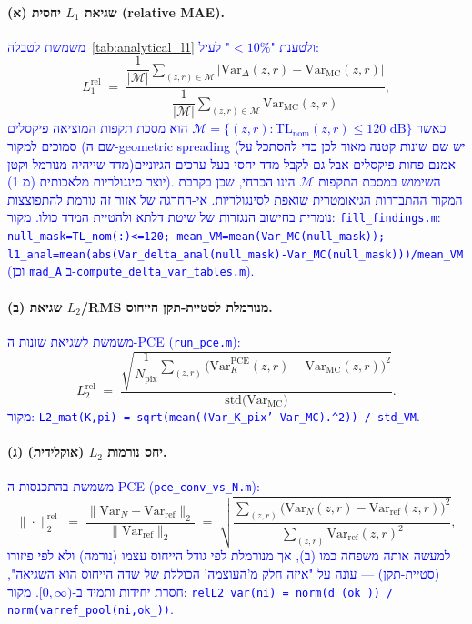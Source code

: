 \documentclass[12pt,a4paper]{article}
\newcommand{\Var}{\mathrm{Var}}
\DeclareRobustCommand{\aiedit}[1]{\textcolor{blue}{#1}}
\begin{document}
\paragraph{(א) שגיאת $L_1$ יחסית (\textenglish{relative MAE}).}
\aiedit{משמשת לטבלה~\ref{tab:analytical_l1} ולטענת "$<10\%{}$" לעיל:}
\begin{equation}
  L_1^{\mathrm{rel}} \;=\; \frac{\dfrac{1}{|\mathcal M|}\sum\limits_{(z,r)\in\mathcal M}
  \bigl|\Var_\Delta(z,r)-\Var_{\mathrm{MC}}(z,r)\bigr|}
  {\dfrac{1}{|\mathcal M|}\sum\limits_{(z,r)\in\mathcal M}\Var_{\mathrm{MC}}(z,r)},
  \label{eq:l1_rel}
\end{equation}
\aiedit{כאשר $\mathcal M=\{(z,r):\mathrm{TL}_{\mathrm{nom}}(z,r)\le120\text{ dB}\}$ הוא מסכת תקפות
המוציאה פיקסלים סמוכים למקור (שם ה-\textenglish{geometric spreading} (יש שם שונות קטנה מאוד לכן כדי להסתכל על אמנם פחות פיקסלים אבל גם לקבל  מדד יחסי בעל ערכים הגיוניים(מדד שייהיה מנורמל וקטן מ 1)) יוצר סינגולריות מלאכותית).
השימוש במסכת התקפות $\mathcal{M}$ הינו הכרחי, שכן בקרבת המקור ההתבדרות הגיאומטרית שואפת לסינגולריות.
אי-החרגה של אזור זה גורמת להתפוצצות נומרית בחישוב הנגזרות של שיטת דלתא ולהטיית המדד כולו.
מקור: \texttt{fill\_findings.m}: \texttt{null\_mask=TL\_nom(:)<=120; mean\_VM=mean(Var\_MC(null\_mask));
l1\_anal=mean(abs(Var\_delta\_anal(null\_mask)-Var\_MC(null\_mask)))/mean\_VM} (וכן \texttt{mad\_A}
ב-\texttt{compute\_delta\_var\_tables.m}).}

\paragraph{(ב) שגיאת $L_2$/\textenglish{RMS} מנורמלת לסטיית-תקן הייחוס.}
\aiedit{משמשת לשגיאת שונות ה-\textenglish{PCE} (\texttt{run\_pce.m}):}
\begin{equation}
  L_2^{\mathrm{rel}} \;=\; \frac{\sqrt{\dfrac{1}{N_{\mathrm{pix}}}\sum\limits_{(z,r)}
  \bigl(\Var_K^{\mathrm{PCE}}(z,r)-\Var_{\mathrm{MC}}(z,r)\bigr)^2}}{\mathrm{std}\bigl(\Var_{\mathrm{MC}}\bigr)}.
  \label{eq:l2_rel_std}
\end{equation}
\aiedit{מקור: \texttt{L2\_mat(K,pi) = sqrt(mean((Var\_K\_pix'-Var\_MC).\string^2)) / std\_VM}.}

\paragraph{(ג) יחס נורמות $L_2$ (אוקלידית).}
\aiedit{משמשת בהתכנסות ה-\textenglish{PCE} (\texttt{pce\_conv\_vs\_N.m}):}
\begin{equation}
  \|\cdot\|_2^{\mathrm{rel}} \;=\; \frac{\|\Var_N-\Var_{\mathrm{ref}}\|_2}{\|\Var_{\mathrm{ref}}\|_2}
  \;=\; \sqrt{\frac{\sum_{(z,r)}\bigl(\Var_N(z,r)-\Var_{\mathrm{ref}}(z,r)\bigr)^2}
  {\sum_{(z,r)}\Var_{\mathrm{ref}}(z,r)^2}},
  \label{eq:l2_rel_norm}
\end{equation}
\aiedit{למעשה אותה משפחה כמו (ב), אך מנורמלת לפי גודל הייחוס עצמו (נורמה) ולא לפי פיזורו (סטיית-תקן) —
עונה על "איזה חלק מ'העוצמה' הכוללת של שדה הייחוס הוא השגיאה", חסרת יחידות ותמיד ב-$[0,\infty)$.
מקור: \texttt{relL2\_var(ni) = norm(d\_(ok\_)) / norm(varref\_pool(ni,ok\_))}.}
\end{document}

